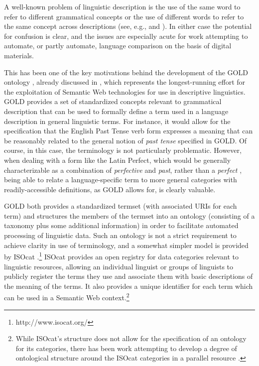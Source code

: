 A well-known problem of linguistic description is the use of the same word to
refer to different grammatical concepts or the use of different words to refer
to the same concept across descriptions (see, e.g.,
 and ). In either
case the potential for confusion is clear, and the issues are especially acute
for work attempting to automate, or partly automate, language comparison on the
basis of digital materials.

This has been one of the key motivations behind the development of the
GOLD ontology
\citep{FarrarLangendoen:2003,FarrarLewis:2007,FarrarLangendoen:2009}, already
discussed in , which represents the longest-running effort for the
exploitation of Semantic Web technologies for use in descriptive linguistics.
GOLD provides a set of standardized concepts relevant to grammatical description
that can be used to formally define a term used in a language description in
general linguistic terms. For instance, it would allow for the specification
that the English Past Tense verb form expresses a meaning that can be reasonably
related to the general notion of \emph{past tense} specified in GOLD. Of course,
in this case, the terminology is not particularly problematic. However, when
dealing with a form like the Latin Perfect, which would be generally
characterizable as a combination of \emph{perfective} and \emph{past}, rather
than a \emph{perfect} \citep[13]{Comrie:1976}, being able to relate a
language-specific term to more general categories with readily-accessible
definitions, as GOLD allows for, is clearly valuable.

GOLD both provides a standardized termset (with associated URIs for each term)
and structures the members of the termset into an ontology (consisting of a
taxonomy plus some additional information) in order to facilitate automated
processing of linguistic data. Such an ontology is not a strict requirement to
achieve clarity in use of terminology, and a somewhat simpler model is provided
by ISOcat
\citep{KempsSnijdersEtAl:2008:LREC,KempsSnijdersEtAl:2008:ehum}.{\footnote{http://www.isocat.org/}}
ISOcat provides an open registry for data categories relevant
to linguistic resources, allowing an individual linguist or groups of linguists
to publicly register the terms they use and associate them with basic
descriptions of the meaning of the terms. It also provides a unique identifier
for each term which can be used in a Semantic Web context.{\footnote{While
ISOcat's structure does not allow for the specification of an ontology for its
categories, there has been work attempting to develop a degree of ontological
structure around the ISOcat categories in a parallel resource
\citep{WrightEtAl:2010,WindhouwerWright:2012}.}}

